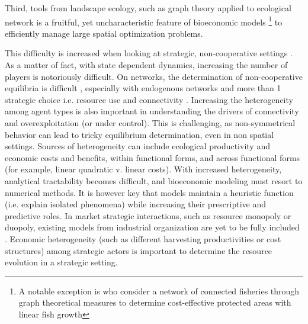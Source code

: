  Third, tools from landscape ecology, such as graph theory applied to ecological network is a fruitful, yet uncharacteristic feature of bioeconomic models \citep{Drechsler20200}\footnote{A notable exception is \cite{fabbri_competition_2022} who consider a network of connected fisheries through graph theoretical measures to determine cost-effective protected areas with linear fish growth} to efficiently manage large spatial optimization problems.

This difficulty is increased when looking at strategic, non-cooperative settings \citep{levin_social-ecological_2013}. As a matter of fact, with state dependent dynamics, increasing the number of players is notoriously difficult. 
On networks, the determination of non-cooperative equilibria is difficult \citep{bramoulle_strategic_2014}, especially with endogenous networks and more than 1 strategic choice i.e. resource use and connectivity  \citep{chen_multiple_2018, sadler_games_nodate}. Increasing the heterogeneity among agent types is also important in understanding the drivers of connectivity and overexploitation (or under control). This is challenging, as non-symmetrical behavior can lead to tricky equilibrium determination, even in non spatial settings. Sources of heterogeneity can include ecological productivity and economic costs and benefits, within functional forms, and across functional forms (for example, linear quadratic v. linear costs). With increased heterogeneity, analytical tractability becomes difficult, and bioeconomic modeling must resort to numerical methods. It is however key that models maintain a heuristic function (i.e. explain isolated phenomena) while increasing their prescriptive and predictive roles. 
In market strategic interactions, such as resource monopoly or duopoly, existing models from industrial organization are yet to be fully included \citep{damania_economics_2007}. Economic heterogeneity (such as different harvesting productivities or cost structures) among strategic actors is important to determine the resource evolution in a strategic setting.


 


